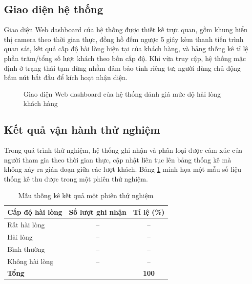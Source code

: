 \documentclass{iaesarticle}
\begin{document}
\subsection{Giao diện hệ thống}
Giao diện Web dashboard của hệ thống được thiết kế trực quan, gồm khung hiển thị camera theo thời gian thực, đồng hồ đếm ngược 5 giây kèm thanh tiến trình quan sát, kết quả cấp độ hài lòng hiện tại của khách hàng, và bảng thống kê tỉ lệ phần trăm/tổng số lượt khách theo bốn cấp độ. Khi vừa truy cập, hệ thống mặc định ở trạng thái tạm dừng nhằm đảm bảo tính riêng tư; người dùng chủ động bấm nút bắt đầu để kích hoạt nhận diện.

\begin{figure}[H]
\centering
{}
\vspace{.7em}
\caption{Giao diện Web dashboard của hệ thống đánh giá mức độ hài lòng khách hàng}
\end{figure}

\subsection{Kết quả vận hành thử nghiệm}
Trong quá trình thử nghiệm, hệ thống ghi nhận và phân loại được cảm xúc của người tham gia theo thời gian thực, cập nhật liên tục lên bảng thống kê mà không xảy ra gián đoạn giữa các lượt khách. Bảng \ref{tab:ketqua} minh họa một mẫu số liệu thống kê thu được trong một phiên thử nghiệm.

\begin{table}[H]
	\centering
	\fontsize{8pt}{10pt}\selectfont
	\caption{Mẫu thống kê kết quả một phiên thử nghiệm}
	\label{tab:ketqua}
	\begin{tabular}{lcc}
		\hline
		Cấp độ hài lòng & Số lượt ghi nhận & Tỉ lệ (\%) \\
		\hline
		Rất hài lòng & -- & -- \\
		Hài lòng & -- & -- \\
		Bình thường & -- & -- \\
		Không hài lòng & -- & -- \\
		\hline
		\textbf{Tổng} & \textbf{--} & \textbf{100} \\
		\hline
	\end{tabular}
\end{table}
\end{document}

